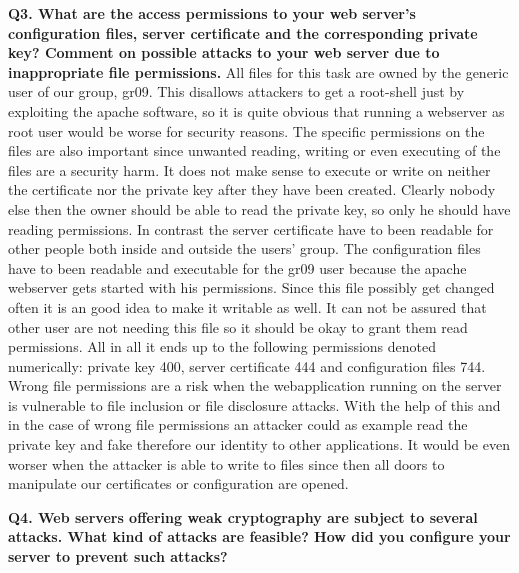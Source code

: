 \newline
\noindent
{\bf Q3. What are the access permissions to your web server’s configuration files,
server certificate and the corresponding private key? Comment on possible
attacks to your web server due to inappropriate file permissions.}
\newline
\noindent
All files for this task are owned by the generic user of our group, gr09.  
This disallows attackers to get a root-shell just by exploiting the apache software, so it is quite obvious that running a webserver as root user would be worse for security reasons.
The specific permissions on the files are also important since unwanted reading, writing or even executing of the files are a security harm.
It does not make sense to execute or write on neither the certificate nor the private key after they have been created.
Clearly nobody else then the owner should be able to read the private key, so only he should have reading permissions.
In contrast the server certificate have to been readable for other people both inside and outside the users' group.
The configuration files have to been readable and executable for the gr09 user because the apache webserver gets started with his permissions.
Since this file possibly get changed often it is an good idea to make it writable as well. 
It can not be assured that other user are not needing this file so it should be okay to grant them read permissions.
All in all it ends up to the following permissions denoted numerically: private key 400, server certificate 444 and configuration files 744.
Wrong file permissions are a risk when the webapplication running on the server is vulnerable to file inclusion or file disclosure attacks.
With the help of this and in the case of wrong file permissions an attacker could as example read the private key and fake therefore our identity to other applications.
It would be even worser when the attacker is able to write to files since then all doors to manipulate our certificates or configuration are opened.

\noindent
{\bf Q4. Web servers offering weak cryptography are subject to several attacks.
What kind of attacks are feasible? How did you configure your server to prevent such attacks?}


